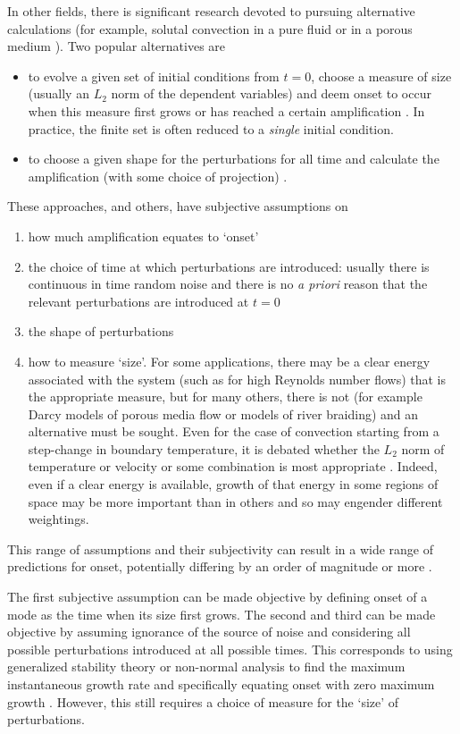 \documentclass[letterpaper,prl,aps,preprint,superscriptaddress]{revtex4-1}
\begin{document}
In other fields, there is significant research devoted to pursuing alternative calculations (for example, solutal convection in a pure fluid or in a porous medium \cite{references}).  Two popular alternatives are
\begin{itemize}
\itemsep=0cm
\item to evolve a given set of initial conditions from $t=0$, choose a measure of size (usually an $L_2$ norm of the dependent variables) and deem onset to occur when this measure first grows or has reached a certain amplification \cite{Foster,GreshoSani,EnnisKingPaterson,more}.  In practice, the finite set is often reduced to a \emph{single} initial condition.
\item to choose a given shape for the perturbations for all time and calculate the amplification (with some choice of projection) \cite{Ben,Riaz,more}.
\end{itemize}
These approaches, and others, have subjective assumptions on
\begin{enumerate}
\itemsep=0cm
\item how much amplification equates to `onset'
\item the choice of time at which perturbations are introduced: usually there is continuous in time random noise and there is no \emph{a priori} reason that the relevant perturbations are introduced at $t=0$ \cite{GreshoSani}
\item the shape of perturbations
\item how to measure `size'.  For some applications, there may be a clear energy associated with the system (such as for high Reynolds number flows) that is the appropriate measure, but for many others, there is not (for example Darcy models of porous media flow or models of river braiding) and an alternative must be sought.  Even for the case of convection starting from a step-change in boundary temperature, it is debated whether the $L_2$ norm of temperature or velocity or some combination is most appropriate \cite{GreshoSani}.  Indeed, even if a clear energy is available, growth of that energy in some regions of space may be more important than in others and so may engender different weightings.
\end{enumerate}
This range of assumptions and their subjectivity can result in a wide range of predictions for onset, potentially differing by an order of magnitude or more \cite{example}.

The first subjective assumption can be made objective by defining onset of a mode as the time when its size first grows.  The second and third can be made objective by assuming ignorance of the source of noise and considering all possible perturbations introduced at all possible times.  This corresponds to using generalized stability theory or non-normal analysis to find the maximum instantaneous growth rate and specifically equating onset with zero maximum growth \cite{FarrellIoannou,SlimRama10}.  However, this still requires a choice of measure for the `size' of perturbations.
\end{document}
